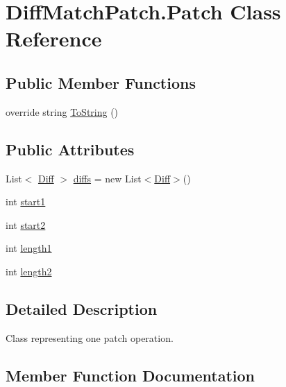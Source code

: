 \hypertarget{class_diff_match_patch_1_1_patch}{}\section{Diff\+Match\+Patch.\+Patch Class Reference}
\label{class_diff_match_patch_1_1_patch}
\subsection*{Public Member Functions}
\begin{DoxyCompactItemize}
\item 
override string \hyperlink{class_diff_match_patch_1_1_patch_a78eb246ee224752c77e6d4566055937b}{To\+String} ()
\end{DoxyCompactItemize}
\subsection*{Public Attributes}
\begin{DoxyCompactItemize}
\item 
List$<$ \hyperlink{class_diff_match_patch_1_1_diff}{Diff} $>$ \hyperlink{class_diff_match_patch_1_1_patch_af813fcb2d14a01d8220e48d5ed16604e}{diffs} = new List$<$\hyperlink{class_diff_match_patch_1_1_diff}{Diff}$>$()
\item 
int \hyperlink{class_diff_match_patch_1_1_patch_a6c57df6dfdffba89a860ca8eaffea9f0}{start1}
\item 
int \hyperlink{class_diff_match_patch_1_1_patch_aef356b2b84634d28f4cddafef71514eb}{start2}
\item 
int \hyperlink{class_diff_match_patch_1_1_patch_abbea15b8ae651468e5825752f1ad358b}{length1}
\item 
int \hyperlink{class_diff_match_patch_1_1_patch_ae817d54eebda521cb353d72d31af146a}{length2}
\end{DoxyCompactItemize}


\subsection{Detailed Description}
Class representing one patch operation. 

\subsection{Member Function Documentation}
\hypertarget{class_diff_match_patch_1_1_patch_a78eb246ee224752c77e6d4566055937b}{}
